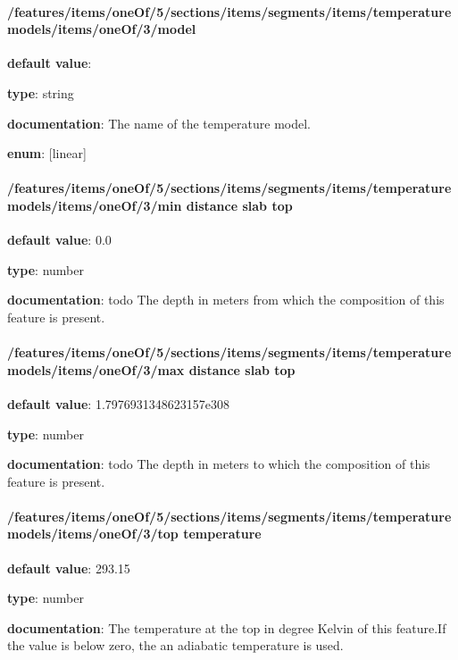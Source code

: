 \paragraph{/features/items/oneOf/5/sections/items/segments/items/temperature models/items/oneOf/3/model} \begin{itemized}
\item {\bf default value}: 
\item {\bf type}: string
\item {\bf documentation}: The name of the temperature model.
\item {\bf enum}: [linear]\end{itemized}\paragraph{/features/items/oneOf/5/sections/items/segments/items/temperature models/items/oneOf/3/min distance slab top} \begin{itemized}
\item {\bf default value}: 0.0
\item {\bf type}: number
\item {\bf documentation}: todo The depth in meters from which the composition of this feature is present.
\end{itemized}\paragraph{/features/items/oneOf/5/sections/items/segments/items/temperature models/items/oneOf/3/max distance slab top} \begin{itemized}
\item {\bf default value}: 1.7976931348623157e308
\item {\bf type}: number
\item {\bf documentation}: todo The depth in meters to which the composition of this feature is present.
\end{itemized}\paragraph{/features/items/oneOf/5/sections/items/segments/items/temperature models/items/oneOf/3/top temperature} \begin{itemized}
\item {\bf default value}: 293.15
\item {\bf type}: number
\item {\bf documentation}: The temperature at the top in degree Kelvin of this feature.If the value is below zero, the an adiabatic temperature is used.

\end{itemized}
